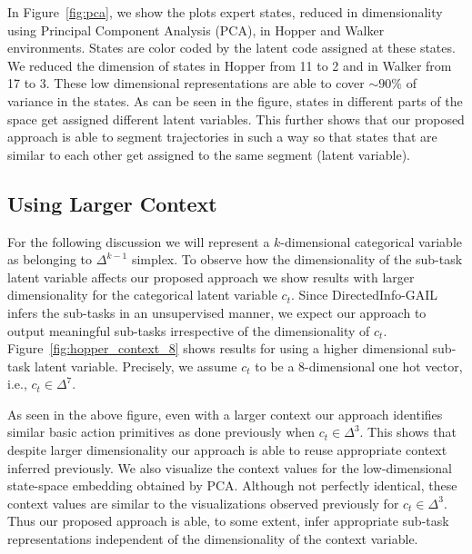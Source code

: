 \documentclass{article} %
\begin{document}
In Figure~\ref{fig:pca}, we show the plots expert states, reduced in dimensionality using Principal Component Analysis (PCA), in Hopper and Walker environments. States are color coded by the latent code assigned at these states. We reduced the dimension of states in Hopper from 11 to 2 and in Walker from 17 to 3.
These low dimensional representations are able to cover $\sim90\%$ of variance in the states.
As can be seen in the figure, states in different parts of the space get assigned different latent variables. This further shows that our proposed approach is able to segment trajectories in such a way so that states that are similar to each other get assigned to the same segment (latent variable).

\subsection{Using Larger Context}\label{sec:appendix_large_context}


For the following discussion we will represent a $k$-dimensional categorical variable as belonging to $\Delta^{k-1}$ simplex.
To observe how the dimensionality of the sub-task latent variable affects our proposed approach we show results with larger dimensionality for the categorical latent variable $c_t$. 
Since DirectedInfo-GAIL infers the sub-tasks in an unsupervised manner, we expect our approach to output meaningful sub-tasks irrespective of the dimensionality of $c_t$. Figure~\ref{fig:hopper_context_8} shows results for using a higher dimensional sub-task latent variable. Precisely, we assume $c_t$ to be a 8-dimensional one hot vector, i.e., $c_t \in \Delta^7$.

As seen in the above figure, even with a larger context our approach identifies similar basic action primitives as done previously when $c_t \in \Delta^3$. This shows that despite larger dimensionality our approach is able to reuse appropriate context inferred previously. 
We also visualize the context values for the low-dimensional state-space embedding obtained by PCA. Although not perfectly identical, these context values are similar to the visualizations observed previously for $c_t  \in \Delta^3$.
Thus our proposed approach is able, to some extent, infer appropriate sub-task representations independent of the dimensionality of the context variable.
\end{document}
